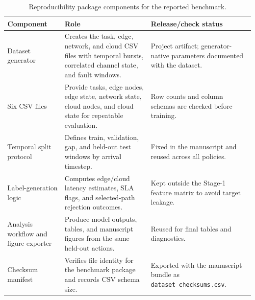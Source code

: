 \begin{table}[!t]
\centering
\caption{Reproducibility package components for the reported benchmark.}
\label{tab:reproducibility_manifest}
\scriptsize
\begin{tabularx}{\textwidth}{@{}lXX@{}}
\toprule
Component & Role & Release/check status \\
\midrule
Dataset generator & Creates the task, edge, network, and cloud CSV files with temporal bursts, correlated channel state, and fault windows. & Project artifact; generator-native parameters documented with the dataset. \\
Six CSV files & Provide tasks, edge nodes, edge state, network state, cloud nodes, and cloud state for repeatable evaluation. & Row counts and column schemas are checked before training. \\
Temporal split protocol & Defines train, validation, gap, and held-out test windows by arrival timestep. & Fixed in the manuscript and reused across all policies. \\
Label-generation logic & Computes edge/cloud latency estimates, SLA flags, and selected-path rejection outcomes. & Kept outside the Stage-1 feature matrix to avoid target leakage. \\
Analysis workflow and figure exporter & Produce model outputs, tables, and manuscript figures from the same held-out actions. & Reused for final tables and diagnostics. \\
Checksum manifest & Verifies file identity for the benchmark package and records CSV schema size. & Exported with the manuscript bundle as \texttt{dataset\_checksums.csv}. \\
\bottomrule
\end{tabularx}
\end{table}
